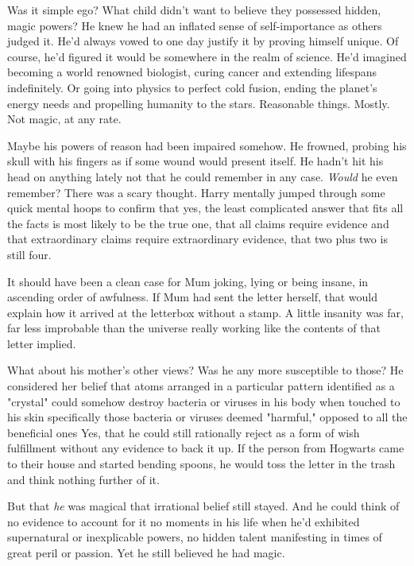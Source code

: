 Was it simple ego? What child didn't want to believe they
possessed hidden, magic powers? He knew he had an
inflated sense of self-importance as others judged it. He'd
always vowed to one day justify it by proving himself
unique. Of course, he'd figured it would be somewhere in
the realm of science. He'd imagined becoming a world
renowned biologist, curing cancer and extending lifespans
indefinitely. Or going into physics to perfect cold fusion,
ending the planet's energy needs and propelling humanity
to the stars. Reasonable things. Mostly. Not magic, at any
rate.

Maybe his powers of reason had been impaired somehow.
He frowned, probing his skull with his fingers as if some
wound would present itself. He hadn't hit his head on
anything lately{\el} not that he could remember in any case.
\emph{Would} he even remember? There was a scary thought.
Harry mentally jumped through some quick mental hoops
to confirm that yes, the least complicated answer that fits all
the facts is most likely to be the true one, that all claims
require evidence and that extraordinary claims require
extraordinary evidence, that two plus two is still four.

It should have been a clean case for Mum joking, lying or
being insane, in ascending order of awfulness. If Mum had
sent the letter herself, that would explain how it arrived at
the letterbox without a stamp. A little insanity was far, far
less improbable than the universe really working like the
contents of that letter implied.

What about his mother's other views? Was he any more
susceptible to those? He considered her belief that atoms
arranged in a particular pattern identified as a "crystal"
could somehow destroy bacteria or viruses in his body
when touched to his skin{\el} specifically those bacteria or
viruses deemed "harmful," opposed to all the beneficial
ones{\el} Yes, that he could still rationally reject as a form of
wish fulfillment without any evidence to back it up. If the
person from Hogwarts came to their house and started
bending spoons, he would toss the letter in the trash and
think nothing further of it.

But that \emph{he} was magical{\el} that irrational belief still stayed.
And he could think of no evidence to account for it{\el} no
moments in his life when he'd exhibited supernatural or
inexplicable powers, no hidden talent manifesting in times
of great peril or passion. Yet he still believed he had magic.

